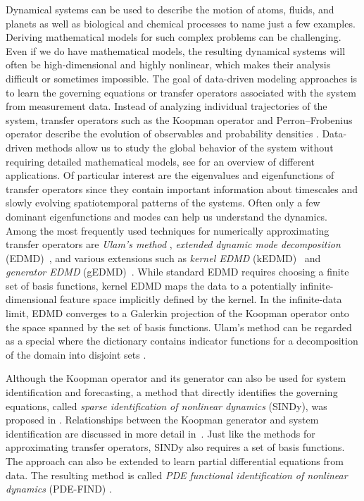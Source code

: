 \documentclass
[
    a4paper,
    DIV=11,
    abstract=true,
    11pt,
]
{scrartcl}
\theoremstyle{definition}
\begin{document}
Dynamical systems can be used to describe the motion of atoms, fluids, and planets as well as biological and chemical processes to name just a few examples. Deriving mathematical models for such complex problems can be challenging. Even if we do have mathematical models, the resulting dynamical systems will often be high-dimensional and highly nonlinear, which makes their analysis difficult or sometimes impossible. The goal of data-driven modeling approaches is to learn the governing equations or transfer operators associated with the system from measurement data. Instead of analyzing individual trajectories of the system, transfer operators such as the Koopman operator and Perron--Frobenius operator describe the evolution of observables and probability densities \cite{LaMa94, DJ99, Mezic05, KKS16}. Data-driven methods allow us to study the global behavior of the system without requiring detailed mathematical models, see \cite{KD24} for an overview of different applications. Of particular interest are the eigenvalues and eigenfunctions of transfer operators since they contain important information about timescales and slowly evolving spatiotemporal patterns of the systems. Often only a few dominant eigenfunctions and modes can help us understand the dynamics. Among the most frequently used techniques for numerically approximating transfer operators are \emph{Ulam's method} \cite{Ulam60, CU02}, \emph{extended dynamic mode decomposition} (EDMD)~\cite{williams2015data, KKS16}, and various extensions such as \emph{kernel EDMD} (kEDMD)~\cite{WRK15, KSM20} and \emph{generator EDMD} (gEDMD)~\cite{KNPNCS20}. While standard EDMD requires choosing a finite set of basis functions, kernel EDMD maps the data to a potentially infinite-dimensional feature space implicitly defined by the kernel. In the infinite-data limit, EDMD converges to a Galerkin projection of the Koopman operator onto the space spanned by the set of basis functions. Ulam's method can be regarded as a special where the dictionary contains indicator functions for a decomposition of the domain into disjoint sets \cite{KKS16}.

Although the Koopman operator and its generator can also be used for system identification and forecasting, a method that directly identifies the governing equations, called \emph{sparse identification of nonlinear dynamics} (SINDy), was proposed in \cite{brunton2016discovering}. Relationships between the Koopman generator and system identification are discussed in more detail in~\cite{MauGon16, KNPNCS20}. Just like the methods for approximating transfer operators, SINDy also requires a set of basis functions. The approach can also be extended to learn partial differential equations from data. The resulting method is called \emph{PDE functional identification of nonlinear dynamics} (PDE-FIND) \cite{rudy2017data}.
\end{document}

